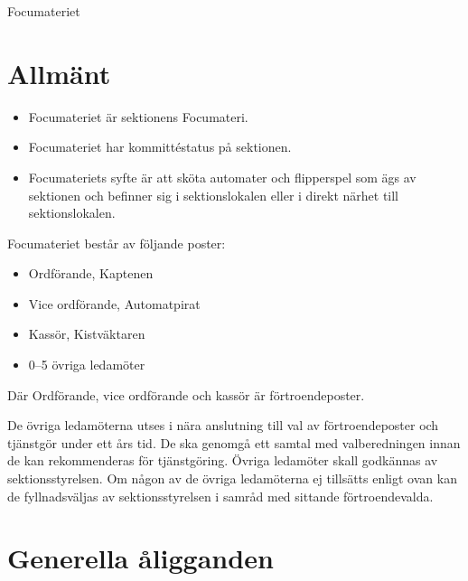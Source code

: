 \documentclass[a4paper]{article}
\begin{document}
\renewcommand{\forening}{Focumateriet} %

\begin{foreningenv}{\forening{}} %
    \section{Allmänt}
    \begin{itemize}
        \item Focumateriet är sektionens Focumateri.
        \item Focumateriet har kommittéstatus på sektionen.
        \item Focumateriets syfte är att sköta automater och flipperspel som ägs av sektionen och befinner sig i sektionslokalen eller i direkt närhet till sektionslokalen.
    \end{itemize}
    
    Focumateriet består av följande poster:
    \begin{itemize}
        \item Ordförande, Kaptenen
        \item Vice ordförande, Automatpirat
        \item Kassör, Kistväktaren
        \item 0--5 övriga ledamöter
    \end{itemize}
    Där Ordförande, vice ordförande och kassör är förtroendeposter.
    
    De övriga ledamöterna utses i nära anslutning till val av förtroendeposter och tjänstgör under ett års tid. De ska genomgå ett samtal med valberedningen innan de kan rekommenderas för tjänstgöring. Övriga ledamöter skall godkännas av sektionsstyrelsen. Om någon av de övriga ledamöterna ej tillsätts enligt ovan kan de fyllnadsväljas av sektionsstyrelsen i samråd med sittande förtroendevalda.
    
    \section{Generella åligganden}
    \aliggkom{}
    

\end{foreningenv}
\end{document}
